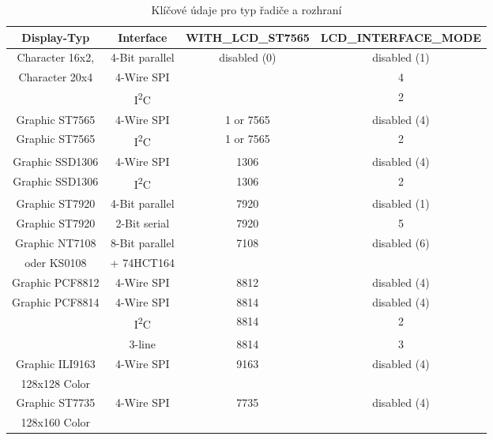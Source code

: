 \begin{description}
\begin{table}[H]
  \begin{center}
    \begin{tabular}{| c | c | c | c|}
    \hline
 Display-Typ        &  Interface     & WITH\_LCD\_ST7565 &  LCD\_INTERFACE\_MODE \\
    \hline
    \hline
  Character 16x2,   & 4-Bit parallel &  disabled (0)      & disabled (1) \\
  Character 20x4    & 4-Wire SPI     &                    &    4   \\
                  & I\textsuperscript{2}C &               &    2   \\
    \hline
  Graphic ST7565    & 4-Wire SPI      & 1 or 7565          & disabled (4) \\
    \hline
  Graphic ST7565  & I\textsuperscript{2}C & 1 or 7565     &   2 \\
    \hline
  Graphic SSD1306   & 4-Wire SPI      & 1306               & disabled (4) \\
    \hline
  Graphic SSD1306 & I\textsuperscript{2}C & 1306          &   2 \\
    \hline
  Graphic ST7920    & 4-Bit parallel  & 7920              & disabled (1) \\
    \hline
  Graphic ST7920    & 2-Bit serial    & 7920               &  5 \\
    \hline
  Graphic NT7108    & 8-Bit parallel  & 7108              & disabled (6) \\
  oder KS0108       &    + 74HCT164   &                   &      \\
    \hline
  Graphic PCF8812   & 4-Wire SPI      & 8812              & disabled (4) \\
    \hline
  Graphic PCF8814   & 4-Wire SPI      & 8814              & disabled (4) \\
                  & I\textsuperscript{2}C & 8814          &   2 \\
                    & 3-line          & 8814              &   3 \\
    \hline
  Graphic ILI9163   & 4-Wire SPI      & 9163              & disabled (4) \\
  128x128 Color     &                 &                   &              \\
    \hline
  Graphic ST7735    & 4-Wire SPI      & 7735              & disabled (4) \\
  128x160 Color     &                 &                   &              \\
    \hline
    \end{tabular}
  \end{center}
  \caption{Klíčové údaje pro typ řadiče a rozhraní}
  \label{tab:cod-display}
\end{table}


\end{description}
